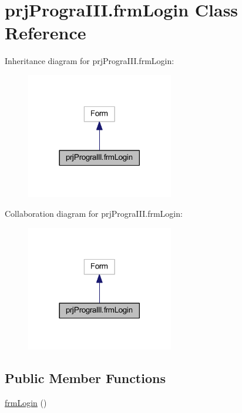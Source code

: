 \hypertarget{classprj_progra_i_i_i_1_1frm_login}{}\section{prj\+Progra\+I\+I\+I.\+frm\+Login Class Reference}
\label{classprj_progra_i_i_i_1_1frm_login}


Inheritance diagram for prj\+Progra\+I\+I\+I.\+frm\+Login\+:
\nopagebreak
\begin{figure}[H]
\begin{center}
\leavevmode
\includegraphics[width=182pt]{classprj_progra_i_i_i_1_1frm_login__inherit__graph}
\end{center}
\end{figure}


Collaboration diagram for prj\+Progra\+I\+I\+I.\+frm\+Login\+:
\nopagebreak
\begin{figure}[H]
\begin{center}
\leavevmode
\includegraphics[width=182pt]{classprj_progra_i_i_i_1_1frm_login__coll__graph}
\end{center}
\end{figure}
\subsection*{Public Member Functions}
\begin{DoxyCompactItemize}
\item 
\hyperlink{classprj_progra_i_i_i_1_1frm_login_a0753b9efaeda29b58172159d1c01d3f4}{frm\+Login} ()
\end{DoxyCompactItemize}
